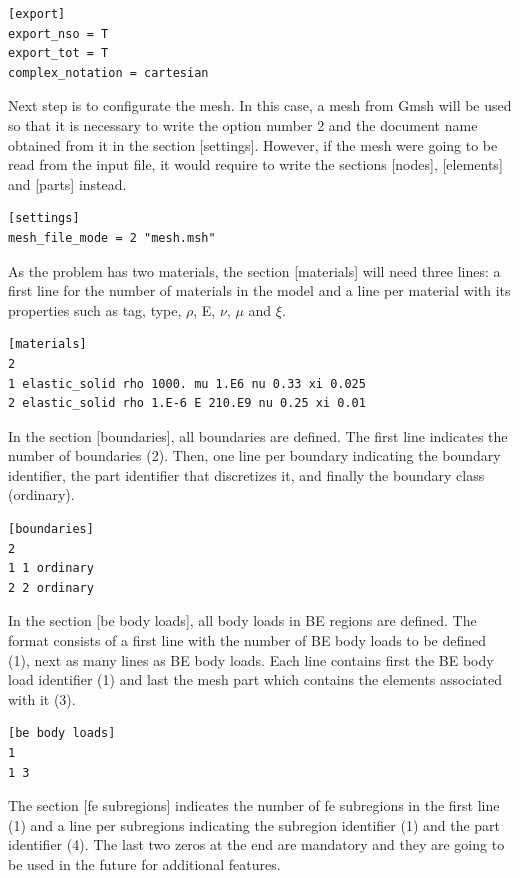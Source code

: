 \documentclass[a4]{article}
\begin{document}
\begin{Verbatim}
[export]
export_nso = T
export_tot = T
complex_notation = cartesian
\end{Verbatim}

Next step is to configurate the mesh. In this case, a mesh from Gmsh will be used so that it is necessary to write the option number 2 and the document name obtained from it in the section [settings]. However, if the mesh were going to be read from the input file, it would require to write the sections [nodes], [elements] and [parts] instead.

\begin{Verbatim}	
[settings]
mesh_file_mode = 2 "mesh.msh"
\end{Verbatim}

As the problem has two materials, the section [materials] will need three lines: a first line for the number of materials in the model and a line per material with its properties such as tag, type, $\rho$, E, $\nu$, $\mu$ and $ \xi $.

\begin{Verbatim}
[materials]
2
1 elastic_solid rho 1000. mu 1.E6 nu 0.33 xi 0.025
2 elastic_solid rho 1.E-6 E 210.E9 nu 0.25 xi 0.01
\end{Verbatim}

In the section [boundaries], all boundaries are defined. The first line indicates the number of boundaries (2). Then, one line per boundary indicating the boundary identifier, the part identifier that discretizes it, and finally the boundary class (ordinary).

\begin{Verbatim}
[boundaries]
2
1 1 ordinary
2 2 ordinary
\end{Verbatim}

In the section [be body loads], all body loads in BE regions are defined. The format consists of a first line with the number of BE body loads to be defined (1), next as many lines as BE body loads. Each line contains first the BE body load identifier (1) and last the mesh part which contains the elements associated with it (3).

\begin{Verbatim}
[be body loads]
1
1 3
\end{Verbatim}

The section [fe subregions] indicates the number of fe subregions in the first line (1) and a line per subregions indicating the subregion identifier (1) and the part identifier (4). The last two zeros at the end are mandatory and they are going to be used in the future for additional features.
\end{document}
